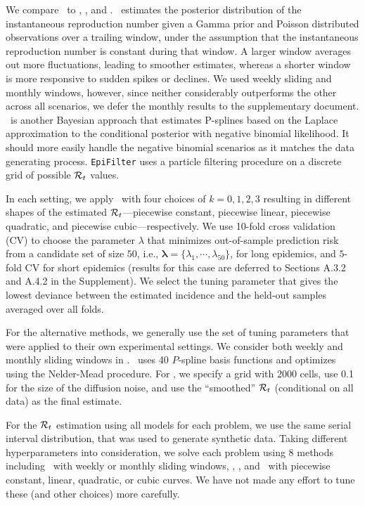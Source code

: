 We compare \RtEstim\ to \EpiEstim, \EpiLPS, and \EpiFilter. \EpiEstim\ estimates
the posterior distribution of the instantaneous reproduction number given a
Gamma prior and Poisson distributed observations over a trailing window, under
the assumption that the instantaneous reproduction number is constant during
that window. A larger window averages out more fluctuations, leading to smoother
estimates, whereas a shorter window is more responsive to sudden spikes or
declines. We used weekly sliding and monthly windows, however, since neither
considerably outperforms the other across all scenarios, we defer the monthly
results to the supplementary document. \EpiLPS\ is another Bayesian approach
that estimates P-splines based on the Laplace approximation to the conditional
posterior with negative binomial likelihood. It should more easily handle the
negative binomial scenarios as it matches the data generating process.
\texttt{EpiFilter} uses a particle filtering procedure on a discrete grid of
possible $\mathcal{R}_t$ values.

In each setting, we apply \RtEstim\ with four choices of $k=0,1, 2, 3$ resulting
in different shapes of the estimated $\mathcal{R}_t$---piecewise constant, piecewise
linear, piecewise quadratic, and piecewise cubic---respectively. We use 10-fold
cross validation (CV) to choose the parameter $\lambda$ that minimizes
out-of-sample prediction risk from a candidate set of size $50$, i.e.,
$\boldsymbol{\lambda} = \{\lambda_1, \cdots, \lambda_{50}\}$, for long
epidemics, and $5$-fold CV for short epidemics (results for this case are
deferred to Sections A.3.2 and A.4.2 in the Supplement). We select the tuning
parameter that gives the lowest deviance between the estimated
incidence and the held-out samples averaged over all folds. 

For the alternative methods, we generally use the set of tuning parameters that
were applied to their own experimental settings. We consider both weekly and
monthly sliding windows in \EpiEstim. \EpiLPS\ uses 40 $P$-spline basis
functions and optimizes using the Nelder-Mead procedure. For \EpiFilter, we
specify a grid with 2000 cells, use 0.1 for the size of the diffusion noise, and
use the ``smoothed'' $\mathcal{R}_t$ (conditional on all data) as the final estimate. 

For the $\mathcal{R}_t$ estimation using all models for each problem, we use the same
serial interval distribution, that was used to generate synthetic data. Taking
different hyperparameters into consideration, we solve each problem using 8
methods including \EpiEstim\ with weekly or monthly sliding windows, \EpiLPS,
\EpiFilter, and \RtEstim\ with piecewise constant, linear, quadratic, or cubic
curves. We have not made any effort to tune these (and other choices) more
carefully.

